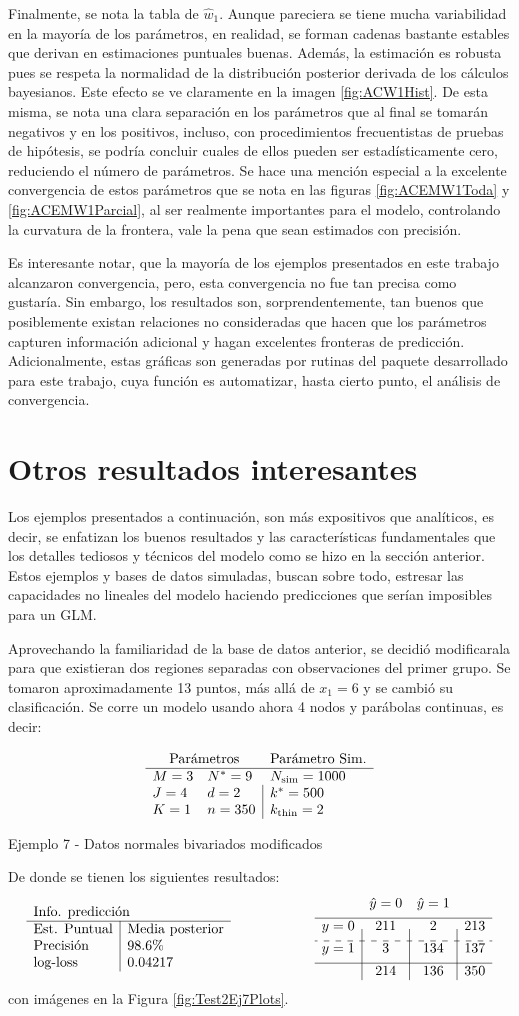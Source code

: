 \documentclass[../Main/Main.tex]{subfiles}
\begin{document}
Finalmente, se nota la tabla de $\hat{w}_1$. Aunque pareciera se tiene mucha variabilidad en la mayoría de los parámetros, en realidad, se forman cadenas bastante estables que derivan en estimaciones puntuales buenas. Además, la estimación es robusta pues se respeta la normalidad de la distribución posterior derivada de los cálculos bayesianos. Este efecto se ve claramente en la imagen \ref{fig:ACW1Hist}. De esta misma, se nota una clara separación en los parámetros que al final se tomarán negativos y en los positivos, incluso, con procedimientos frecuentistas de pruebas de hipótesis, se podría concluir cuales de ellos pueden ser estadísticamente cero, reduciendo el número de parámetros. Se hace una mención especial a la excelente convergencia de estos parámetros que se nota en las figuras \ref{fig:ACEMW1Toda}
y \ref{fig:ACEMW1Parcial}, al ser realmente importantes para el modelo, controlando la curvatura de la frontera, vale la pena que sean estimados con precisión.

Es interesante notar, que la mayoría de los ejemplos presentados en este trabajo alcanzaron convergencia, pero, esta convergencia no fue tan precisa como gustaría. Sin embargo, los resultados son, sorprendentemente, tan buenos que posiblemente existan relaciones no consideradas que hacen que los parámetros capturen información adicional y hagan excelentes fronteras de predicción. Adicionalmente, estas gráficas son generadas por rutinas del paquete desarrollado para este trabajo, cuya función es automatizar, hasta cierto punto, el análisis de convergencia.

\section{Otros resultados interesantes}
Los ejemplos presentados a continuación, son más expositivos que analíticos, es decir, se enfatizan los buenos resultados y las características fundamentales que los detalles tediosos y técnicos del modelo como se hizo en la sección anterior. Estos ejemplos y bases de datos simuladas, buscan sobre todo, estresar las capacidades no lineales del modelo haciendo predicciones que serían imposibles para un GLM.

Aprovechando la familiaridad de la base de datos anterior, se decidió modificarala para que existieran dos regiones separadas con observaciones del primer grupo. Se tomaron aproximadamente 13 puntos, más allá de $x_1 = 6$ y se cambió su clasificación. Se corre un modelo usando ahora 4 nodos y parábolas continuas, es decir:
\begin{table}[H]
$$\paramsmod{3}{4}{1}{9}{2}{350}{1000}{500}{2}$$
\caption*{Ejemplo 7 - Datos normales bivariados modificados}
\label{ej:7}
\end{table}
De donde se tienen los siguientes resultados:
\begin{align*}
\resultados{\text{Media posterior}}{98.6}{0.04217}
\qquad\qquad\qquad
\matconf{211}{2}{213}{3}{134}{137}{214}{136}{350}
\end{align*}
con imágenes en la Figura \ref{fig:Test2Ej7Plots}.
\end{document}
